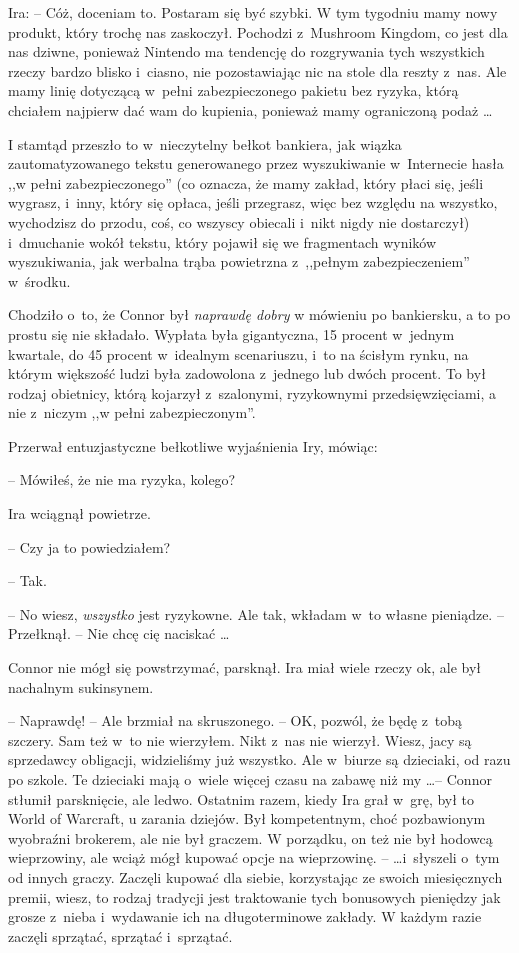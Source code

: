 \documentclass[oneside,polish,11pt,rmheadings]{mwbk}
\begin{document}
\noindent Ira: -- Cóż, doceniam to. Postaram się być szybki. W tym tygodniu mamy nowy produkt, który trochę nas zaskoczył. Pochodzi z~Mushroom Kingdom, co jest dla nas dziwne, ponieważ Nintendo ma tendencję do rozgrywania tych wszystkich rzeczy bardzo blisko i~ciasno, nie pozostawiając nic na stole dla reszty z~nas. Ale mamy linię dotyczącą w~pełni zabezpieczonego pakietu bez ryzyka, którą chciałem najpierw dać wam do kupienia, ponieważ mamy ograniczoną podaż \ldots 

I stamtąd przeszło to w~nieczytelny bełkot bankiera, jak wiązka zautomatyzowanego tekstu generowanego przez wyszukiwanie w~Internecie hasła ,,w pełni zabezpieczonego'' (co oznacza, że mamy zakład, który płaci się, jeśli wygrasz, i~inny, który się opłaca, jeśli przegrasz, więc bez względu na wszystko, wychodzisz do przodu, coś, co wszyscy obiecali i~nikt nigdy nie dostarczył) i~dmuchanie wokół tekstu, który pojawił się we fragmentach wyników wyszukiwania, jak werbalna trąba powietrzna z~,,pełnym zabezpieczeniem'' w~środku.

Chodziło o~to, że Connor był \textit{naprawdę dobry }w mówieniu po bankiersku, a to po prostu się nie składało. Wypłata była gigantyczna, 15 procent w~jednym kwartale, do 45 procent w~idealnym scenariuszu, i~to na ścisłym rynku, na którym większość ludzi była zadowolona z~jednego lub dwóch procent. To był rodzaj obietnicy, którą kojarzył z~szalonymi, ryzykownymi przedsięwzięciami, a nie z~niczym ,,w pełni zabezpieczonym''.

Przerwał entuzjastyczne bełkotliwe wyjaśnienia Iry, mówiąc: 

-- Mówiłeś, że nie ma ryzyka, kolego?

Ira wciągnął powietrze. 

-- Czy ja to powiedziałem? 

-- Tak. 

-- No wiesz, \textit{wszystko }jest ryzykowne. Ale tak, wkładam w~to własne pieniądze. -- Przełknął. -- Nie chcę cię naciskać \ldots  

Connor nie mógł się powstrzymać, parsknął. Ira miał wiele rzeczy ok, ale był nachalnym sukinsynem.

-- Naprawdę! -- Ale brzmiał na skruszonego. -- OK, pozwól, że będę z~tobą szczery. Sam też w~to nie wierzyłem. Nikt z~nas nie wierzył. Wiesz, jacy są sprzedawcy obligacji, widzieliśmy już wszystko. Ale w~biurze są dzieciaki, od razu po szkole. Te dzieciaki mają o~wiele więcej czasu na zabawę niż my \ldots  -- Connor stłumił parsknięcie, ale ledwo. Ostatnim razem, kiedy Ira grał w~grę, był to World of Warcraft, u zarania dziejów. Był kompetentnym, choć pozbawionym wyobraźni brokerem, ale nie był graczem. W porządku, on też nie był hodowcą wieprzowiny, ale wciąż mógł kupować opcje na wieprzowinę. --  \ldots  i~słyszeli o~tym od innych graczy. Zaczęli kupować dla siebie, korzystając ze swoich miesięcznych premii, wiesz, to rodzaj tradycji jest traktowanie tych bonusowych pieniędzy jak grosze z~nieba i~wydawanie ich na długoterminowe zakłady. W każdym razie zaczęli sprzątać, sprzątać i~sprzątać.
\end{document}
